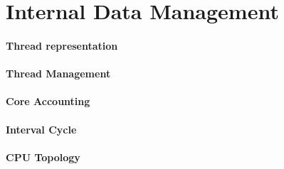 \section{Internal Data Management}
\label{impl:internal}

\paragraph{Thread representation}
\paragraph{Thread Management}
\paragraph{Core Accounting}
\paragraph{Interval Cycle}
\paragraph{CPU Topology}
